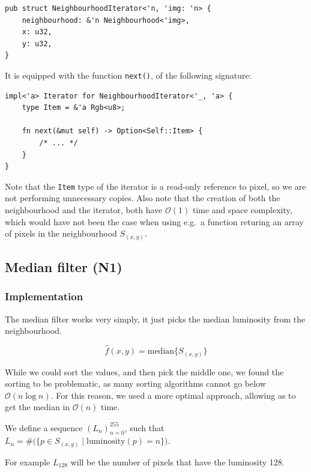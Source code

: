 \documentclass[12pt]{article}
\theoremstyle{definition}
\begin{document}
\begin{lstlisting}
pub struct NeighbourhoodIterator<'n, 'img: 'n> {
    neighbourhood: &'n Neighbourhood<'img>,
    x: u32,
    y: u32,
}
\end{lstlisting}

It is equipped with the function \lstinline{next()}, of the following signature:

\begin{lstlisting}
impl<'a> Iterator for NeighbourhoodIterator<'_, 'a> {
    type Item = &'a Rgb<u8>;

    fn next(&mut self) -> Option<Self::Item> {
        /* ... */
    }
}
\end{lstlisting}

Note that the \lstinline{Item} type of the iterator is a read-only reference to pixel, so we are not performing unnecessary copies.
Also note that the creation of both the neighbourhood and the iterator, both have $\mathcal{O}(1)$ time and space complexity, 
which would have not been the case when using e.g.\ a function returing an array of pixels in the neighbourhood $S_{(x,y)}$.

\subsection{Median filter (N1)}

\subsubsection{Implementation}\label{sec:median-impl}

The median filter works very simply, it just picks the median luminosity from the neighbourhood.

\begin{equation}
    \hat{f}(x,y) = \mathrm{median} \big\{ S_{(x,y)} \big\}
\end{equation}

While we could sort the values, and then pick the middle one,
we found the sorting to be problematic, as many sorting algorithms cannot go below $\mathcal{O}(n \log n)$.
For this reason, we used a more optimal approach, allowing as to get the median in $\mathcal{O}(n)$ time.

We define a sequence $(L_n)_{n=0}^{255}$, such that $L_n = \#\big(\{p \in S_{(x,y)} \mid \mathrm{luminosity}(p) = n\}\big)$.

For example $L_{128}$ will be the number of pixels that have the luminosity 128.
\end{document}
